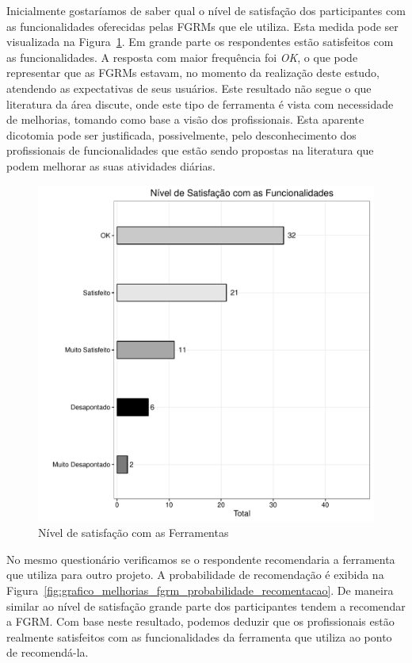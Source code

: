 Inicialmente gostaríamos de saber qual o nível de satisfação dos participantes
com as funcionalidades oferecidas pelas FGRMs que ele utiliza. Esta medida pode
ser visualizada na Figura~\ref{fig:grafico_melhorias_fgrm_nivel_satisfacao}. Em
grande parte os respondentes estão satisfeitos com as funcionalidades. A
resposta com maior frequência foi \textit{OK}, o que pode representar que as
FGRMs estavam, no momento da realização deste estudo, atendendo as expectativas
de seus usuários. Este resultado não segue o que literatura da área discute,
onde este tipo de ferramenta é vista com necessidade de melhorias, tomando como
base a visão dos profissionais. Esta aparente dicotomia pode ser justificada,
possivelmente, pelo desconhecimento dos profissionais de funcionalidades que
estão sendo propostas na literatura que podem melhorar as suas atividades
diárias.

\begin{figure}[htpb] \centering
    \includegraphics[width=0.6\linewidth]{./chapter-pesquisa-com-profissionais/img/grafico_melhorias_fgrm_nivel_satisfacao.pdf}
    \caption{Nível de satisfação com as Ferramentas}
\label{fig:grafico_melhorias_fgrm_nivel_satisfacao}
\end{figure}

No mesmo questionário verificamos se o respondente recomendaria a ferramenta que
utiliza para outro projeto. A probabilidade de recomendação é exibida na
Figura~\ref{fig:grafico_melhorias_fgrm_probabilidade_recomentacao}. De maneira
similar ao nível de satisfação grande parte dos participantes tendem a
recomendar a FGRM\@. Com base neste resultado, podemos deduzir que os
profissionais estão realmente satisfeitos com as funcionalidades da ferramenta
que utiliza ao ponto de recomendá-la.

